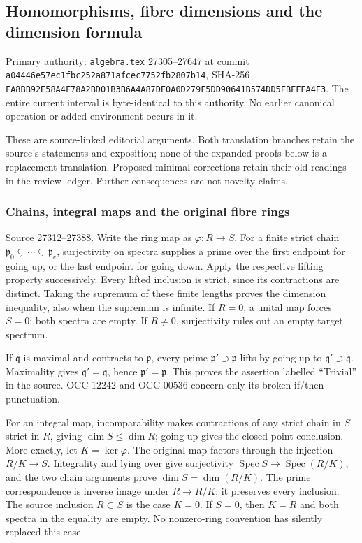 \subsection{Homomorphisms, fibre dimensions and the dimension formula}\label{homomorphisms-fibre-dimensions-and-the-dimension-formula}

Primary authority: \texttt{algebra.tex} 27305--27647 at commit \texttt{a04446e57ec1fbc252a871afcec7752fb2807b14}, SHA-256 \texttt{FA8BB92E58A4F78A2BD01B3B6A4A87DE0A0D279F5DD90641B574DD5FBFFFA4F3}. The entire current interval is byte-identical to this authority. No earlier canonical operation or added environment occurs in it.

These are source-linked editorial arguments. Both translation branches retain the source's statements and exposition; none of the expanded proofs below is a replacement translation. Proposed minimal corrections retain their old readings in the review ledger. Further consequences are not novelty claims.

\subsubsection{Chains, integral maps and the original fibre rings}\label{chains-integral-maps-and-the-original-fibre-rings}

Source 27312--27388. Write the ring map as \(\varphi:R\to S\). For a finite strict chain \(\mathfrak p_0\subsetneq\cdots\subsetneq
\mathfrak p_e\), surjectivity on spectra supplies a prime over the first endpoint for going up, or the last endpoint for going down. Apply the respective lifting property successively. Every lifted inclusion is strict, since its contractions are distinct. Taking the supremum of these finite lengths proves the dimension inequality, also when the supremum is infinite. If \(R=0\), a unital map forces \(S=0\); both spectra are empty. If \(R\ne0\), surjectivity rules out an empty target spectrum.

If \(\mathfrak q\) is maximal and contracts to \(\mathfrak p\), every prime \(\mathfrak p'\supset\mathfrak p\) lifts by going up to \(\mathfrak q'\supset\mathfrak q\). Maximality gives \(\mathfrak q'=\mathfrak q\), hence \(\mathfrak p'=\mathfrak p\). This proves the assertion labelled ``Trivial'' in the source. OCC-12242 and OCC-00536 concern only its broken if/then punctuation.

For an integral map, incomparability makes contractions of any strict chain in \(S\) strict in \(R\), giving \(\dim S\leq\dim R\); going up gives the closed-point conclusion. More exactly, let \(K=\ker\varphi\). The original map factors through the injection \(R/K\to S\). Integrality and lying over give surjectivity \(\operatorname{Spec}S\to\operatorname{Spec}(R/K)\), and the two chain arguments prove \(\dim S=\dim(R/K)\). The prime correspondence is inverse image under \(R\to R/K\); it preserves every inclusion. The source inclusion \(R\subset S\) is the case \(K=0\). If \(S=0\), then \(K=R\) and both spectra in the equality are empty. No nonzero-ring convention has silently replaced this case.

